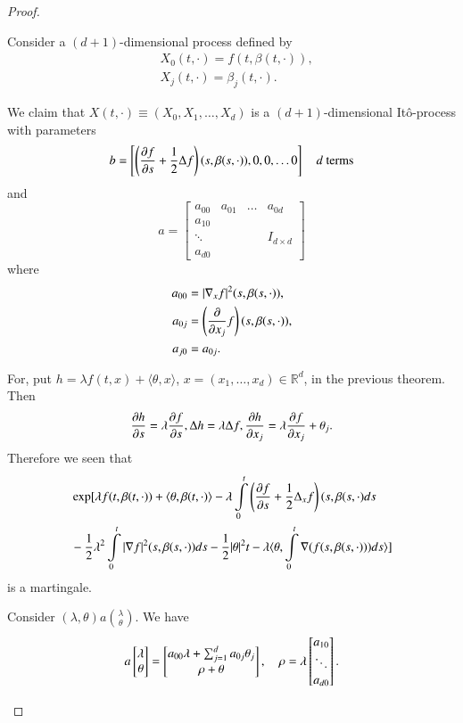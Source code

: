 \begin{proof}

\setcounter{step}{0}
\begin{step}%
Consider a $(d+1)$-dimensional process defined by
\begin{align*}
& X_{0}(t,\cdot)=f(t,\beta(t,\cdot)),\\
& X_{j}(t,\cdot)=\beta_{j}(t,\cdot).
\end{align*}

We claim that $X(t,\cdot)\equiv (X_{0},X_{1},\ldots,X_{d})$ is a
$(d+1)$-dimensional It\^o-process with parameters
$$
b=\left[\left(\frac{\partial f}{\partial s}+\frac{1}{2}\Delta
  f\right)(s,\beta(s,\cdot)),0,0,\ldots 0\right]\quad d\text{~ terms}
$$
and\pageoriginale
$$
a=
\begin{bmatrix}
a_{00} & a_{01} & \ldots & a_{0d}\\
a_{10} & & & \\
\ddots & & & I_{d\times d}\\
a_{d0} & & & 
\end{bmatrix}
$$
where 
\begin{align*}
a_{00} &= |\nabla_{x}f|^{2}(s,\beta(s,\cdot)),\\
a_{0j} &= \left(\frac{\partial}{\partial x_{j}}f\right)(s,\beta(s,\cdot)),\\
a_{j0} &= a_{0j}.
\end{align*}

For, put $h=\lambda f(t,x)+\langle \theta, x\rangle$,
$x=(x_{1},\ldots,x_{d})\in \mathbb{R}^{d}$, in the previous
theorem. Then
$$
\frac{\partial h}{\partial s}=\lambda\frac{\partial f}{\partial s},\Delta h=\lambda\Delta
f,\frac{\partial h}{\partial x_{j}}=\lambda\frac{\partial f}{\partial x_{j}}+\theta_{j}. 
$$
Therefore we seen that
\begin{align*}
&\exp[\lambda f(t,\beta(t,\cdot))+\langle
  \theta,\beta(t,\cdot)\rangle-\lambda\int\limits^{t}_{0}\left(\frac{\partial
    f}{\partial s}+\frac{1}{2}\Delta_{x}f\right)(s,\beta(s,\cdot)ds\\
&-\frac{1}{2}\lambda^{2}\int\limits^{t}_{0}|\nabla
  f|^{2}(s,\beta(s,\cdot))ds-\frac{1}{2}|\theta|^{2}t-\lambda\langle\theta,\int\limits^{t}_{0}\nabla (f(s,\beta(s,\cdot)))ds\rangle]
\end{align*}
is a martingale.

Consider $(\lambda,\theta)a\binom{\lambda}{\theta}$. We have
$$
a
\begin{bmatrix}
\lambda\\
\theta
\end{bmatrix}
=
\begin{bmatrix}
a_{00}\lambda +\sum^{d}_{j=1}a_{0j}\theta_{j}\\
\rho+\theta
\end{bmatrix}
,\quad \rho=\lambda
\begin{bmatrix}
a_{10}\\
\ddots\\
a_{d0}
\end{bmatrix}.
$$


\end{step}
\end{proof}
